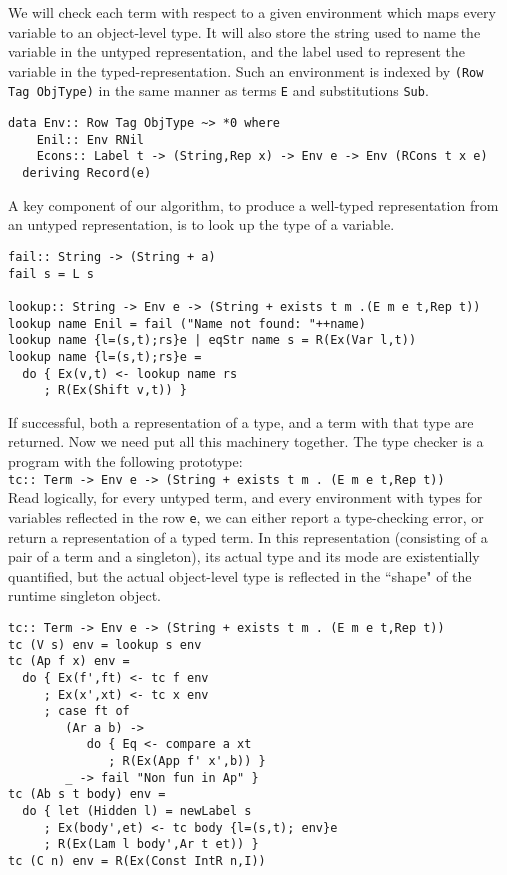 \documentclass[11pt,twoside,A4]{llncs}
\begin{document}
We will check each term with respect to a given environment which maps
every variable to an object-level type. It will also store the string used
to name the variable in the untyped representation, and the label used to
represent the variable in the typed-representation. Such an environment is
indexed by {\tt (Row Tag ObjType)} in the same manner as terms {\tt E} and
substitutions {\tt Sub}.

{\small
\begin{verbatim}
data Env:: Row Tag ObjType ~> *0 where
    Enil:: Env RNil
    Econs:: Label t -> (String,Rep x) -> Env e -> Env (RCons t x e)
  deriving Record(e)
\end{verbatim}}
A key component of our algorithm, to produce a well-typed
representation from an untyped representation, is to
look up the type of a variable. 

{\small
\begin{verbatim}
fail:: String -> (String + a)
fail s = L s

lookup:: String -> Env e -> (String + exists t m .(E m e t,Rep t))
lookup name Enil = fail ("Name not found: "++name)
lookup name {l=(s,t);rs}e | eqStr name s = R(Ex(Var l,t))
lookup name {l=(s,t);rs}e =
  do { Ex(v,t) <- lookup name rs
     ; R(Ex(Shift v,t)) } 
\end{verbatim}}

If successful, both a representation of a type, and a term with that type
are returned. Now we need put all this machinery together. The type
checker is a program with the following prototype:\\ {\tt tc:: Term -> Env e ->
(String + exists t m . (E m e t,Rep t))}\\ Read logically, for every
untyped term, and every environment with types for variables reflected in
the row {\tt e}, we can either report a type-checking error, or 
return a representation of a
typed term. In this representation (consisting of a pair
of a term and a singleton), its actual type and its mode are
existentially quantified, but the actual object-level type
is reflected in the ``shape" of the runtime singleton object.

{\small
\begin{verbatim}
tc:: Term -> Env e -> (String + exists t m . (E m e t,Rep t))
tc (V s) env = lookup s env
tc (Ap f x) env =
  do { Ex(f',ft) <- tc f env
     ; Ex(x',xt) <- tc x env
     ; case ft of
        (Ar a b) ->
           do { Eq <- compare a xt
              ; R(Ex(App f' x',b)) }
        _ -> fail "Non fun in Ap" }
tc (Ab s t body) env =
  do { let (Hidden l) = newLabel s
     ; Ex(body',et) <- tc body {l=(s,t); env}e
     ; R(Ex(Lam l body',Ar t et)) }
tc (C n) env = R(Ex(Const IntR n,I))
\end{verbatim}}
\end{document}
